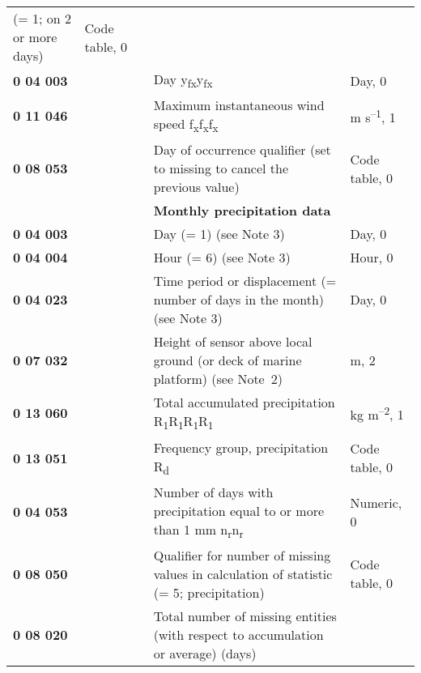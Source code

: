 \begin{longtable}[]{@{}lllll@{}}
\begin{minipage}[t]{0.17\columnwidth}
(= 1; on 2 or more days)\strut
\end{minipage} & \begin{minipage}[t]{0.17\columnwidth}\raggedright
Code table, 0\strut
\end{minipage}\tabularnewline
\textbf{0 04 003} & & & Day y\textsubscript{fx}y\textsubscript{fx} & Day, 0\tabularnewline
\textbf{0 11 046} & & & Maximum instantaneous wind speed f\textsubscript{x}f\textsubscript{x}f\textsubscript{x} & m s\textsuperscript{--1}, 1\tabularnewline
\textbf{0 08 053} & & & Day of occurrence qualifier (set to missing to cancel the previous value) & Code table, 0\tabularnewline
& & & \textbf{Monthly precipitation data} &\tabularnewline
\textbf{0 04 003} & & & Day (= 1) (see Note 3) & Day, 0\tabularnewline
\textbf{0 04 004} & & & Hour (= 6) (see Note 3) & Hour, 0\tabularnewline
\textbf{0 04 023} & & & Time period or displacement (= number of days in the month) (see Note 3) & Day, 0\tabularnewline
\textbf{0 07 032} & & & Height of sensor above local ground (or deck of marine platform) (see Note~2) & m, 2\tabularnewline
\textbf{0 13 060} & & & Total accumulated precipitation R\textsubscript{1}R\textsubscript{1}R\textsubscript{1}R\textsubscript{1} & kg m\textsuperscript{--2}, 1\tabularnewline
\textbf{0 13 051} & & & Frequency group, precipitation R\textsubscript{d} & Code table, 0\tabularnewline
\textbf{0 04 053} & & & Number of days with precipitation equal to or more than 1 mm n\textsubscript{r}n\textsubscript{r} & Numeric, 0\tabularnewline
\textbf{0 08 050} & & & Qualifier for number of missing values in calculation of statistic (= 5; precipitation) & Code table, 0\tabularnewline
\begin{minipage}[t]{0.17\columnwidth}\raggedright
\textbf{0 08 020}\strut
\end{minipage} & \begin{minipage}[t]{0.17\columnwidth}\raggedright
\strut
\end{minipage} & \begin{minipage}[t]{0.17\columnwidth}\raggedright
\strut
\end{minipage} & \begin{minipage}[t]{0.17\columnwidth}\raggedright
Total number of missing entities (with respect to accumulation or average) (days)


\end{minipage}
\end{longtable}
